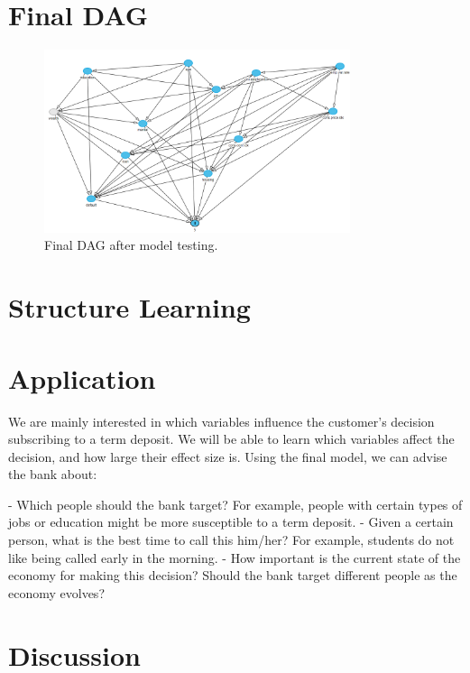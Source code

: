 \documentclass[11pt]{article}
\begin{document}
\section{Final DAG}
\label{sec:final_dag}
\begin{figure}[h]
	\centering
	\includegraphics[width=0.8\textwidth]{images/final_dag}
	\caption{Final DAG after model testing.}
	\label{fig:final_dag}
\end{figure}

\section{Structure Learning}

\section{Application}
We are mainly interested in which variables influence the customer's decision 
subscribing to a term deposit. We will be able to learn which variables affect
the decision, and how large their effect size is. Using the final model, we
can advise the bank about: 

  - Which people should the bank target? For example, people with certain types
      of jobs or education might be more susceptible to a term deposit. 
  - Given a certain person, what is the best time to call this him/her? For
      example, students do not like being called early in the morning. 
  - How important is the current state of the economy for making this decision?
      Should the bank target different people as the economy evolves?

\section{Discussion}

\newpage



\end{document}
